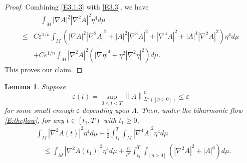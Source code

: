 \documentclass{amsart}
\newtheorem{lemma}[theorem]{Lemma}
\theoremstyle{definition}
\numberwithin{equation}{section}
\begin{document}
\begin{proof}
 Combining \eqref{E3.1.3} with \eqref{E3.3},   we have
\begin{align}\label{E3.4}
        & \quad \int_{M} |\nabla A|^2  |\nabla^2 A |^2\eta^4  d\mu\\
       \leq &  C\varepsilon^{1/n}\int_{M} ( |\nabla  A|^2  |\nabla^{2} A |^2+|A|^2|\nabla^{3} A |^2+ |\nabla^4 A|^2+ |A|^4|\nabla^2 A|^2)
       \eta^4  d\mu\nonumber\\
       &+   C\varepsilon^{1/n}\int_{M}    |\nabla^2A|^2 ( |\nabla \eta|^4 + \eta^2|\nabla^2\eta|^2) d\mu.\nonumber
\end{align}
This proves our claim.
\end{proof}

\begin{lemma} \label{m=2}
 Suppose
$$\varepsilon (t) = \sup_{0 \leq t <T} \left\| A \right\|^{n}_{L^n (\left[ \eta >0 \right])} \leq \varepsilon$$
for some small enough $\varepsilon$ depending upon $\Lambda$.
Then, under the biharmonic flow \eqref{E:theflow}, for any $t\in
\left[ t_1, T\right)$ with $t_1\geq 0$,
\begin{align*}
  &  \int_{M}  \left| \nabla^{2} A(t) \right|^{2} \eta ^{4} d\mu + \frac 12 \int_{t_1}^T\int_{M}  \left| \nabla^{4} A
  \right|^{2} \eta^{4} d\mu \\
  & \quad \leq  \int_{M}  \left| \nabla^{2} A(t_1) \right|^{2} \eta ^{4} d\mu
  + \frac {C}{\rho^4}\int_{t_1}^T\int_{\left[ \eta >0 \right]} (\left| \nabla^{2} A \right|^{2}+|A|^6)
 d\mu \mbox{.}
\end{align*}

\end{lemma}
\end{document}
